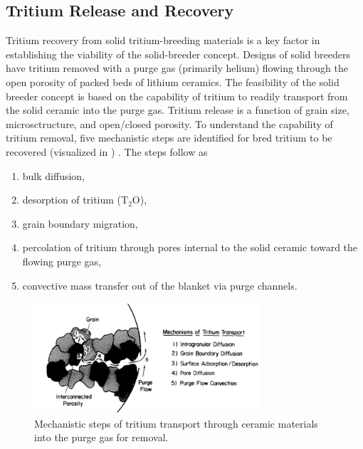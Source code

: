 \documentclass[11pt]{report} %
\begin{document}

\subsection{Tritium Release and Recovery}
Tritium recovery from solid tritium-breeding materials is a key factor in establishing the viability of the solid-breeder concept. Designs of solid breeders have tritium removed with a purge gas (primarily helium) flowing through the open porosity of packed beds of lithium ceramics. The feasibility of the solid breeder concept is based on the capability of tritium to readily transport from the solid ceramic into the purge gas. Tritium release is a function of grain size, microsctructure, and open/closed porosity. To understand the capability of tritium removal, five mechanistic steps are identified for bred tritium to be recovered (visualized in ) . The steps follow as
\begin{enumerate}
\item bulk diffusion,
\item desorption of tritium (T$_2$O),
\item grain boundary migration,
\item percolation of tritium through pores internal to the solid ceramic toward the flowing purge gas,
\item convective mass transfer out of the blanket via purge channels.
\end{enumerate}

\begin{figure}[ht]
	\centering
	\includegraphics[width=0.75\textwidth]{images/mechanisms_tritium_transport} 
	\caption{Mechanistic steps of tritium transport through ceramic materials into the purge gas for removal.}
	\label{fig:mechanisms_tritium_transport}
\end{figure}
\end{document}
